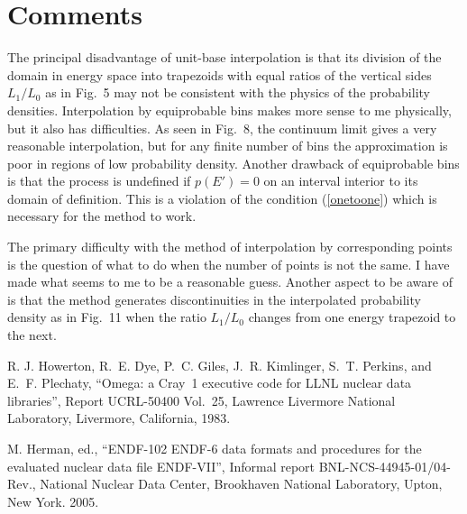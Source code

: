 \documentclass[11pt]{article}
\begin{document}
\section{Comments}
The principal disadvantage of unit-base interpolation is that
its division of the domain in energy space into trapezoids with
equal ratios of the vertical sides $L_1/L_0$ as in Fig.~5 may
not be consistent with the physics of the probability densities.
Interpolation by equiprobable bins makes more sense to me physically,
but it also has difficulties.  As seen in Fig.~8, the continuum
limit gives a very reasonable interpolation, but for any finite
number of bins the approximation is poor in regions of low
probability density.  Another drawback of equiprobable bins
is that the process is undefined if $p(E') = 0$ on an interval 
interior to its domain of definition.
This is a violation of the condition (\ref{onetoone})
which is necessary for the method to work.

The primary difficulty with the method of interpolation by
corresponding points is the question of what to do when the
number of points is not the same.  I have made what seems to me
to be a reasonable guess.  Another aspect to be aware of is that
the method generates discontinuities in the interpolated probability
density as in Fig.~11 when the ratio $L_1/L_0$ changes from one
energy trapezoid to the next.


\begin{thebibliography}{9}

 R. J. Howerton, R.~E. Dye, P.~C. Giles,
J.~R. Kimlinger, S.~T. Perkins, and E.~F. Plechaty,
``Omega: a Cray~1 executive code for LLNL nuclear data
libraries'',
Report UCRL-50400 Vol.~25, 
Lawrence Livermore National Laboratory, Livermore, California,
1983.

 M. Herman, ed.,
``ENDF-102 ENDF-6 data formats and procedures for the evaluated
nuclear data file ENDF-VII'', 
Informal report BNL-NCS-44945-01/04-Rev.,
National Nuclear Data Center,
Brookhaven National Laboratory, Upton, New York. 2005.

\end{thebibliography}
\end{document}
